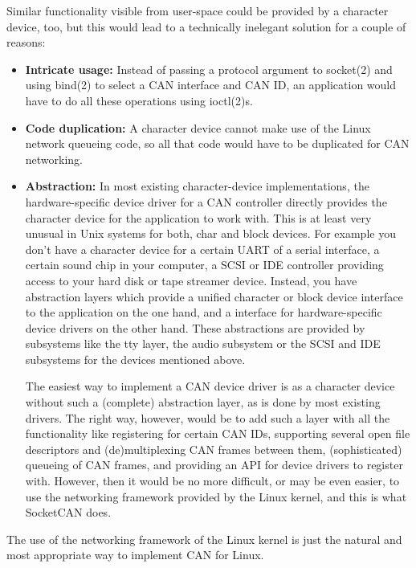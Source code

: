 \documentclass[a4paper,8pt,english]{sphinxmanual}
\begin{document}
Similar functionality visible from user-space could be provided by a
character device, too, but this would lead to a technically inelegant
solution for a couple of reasons:
\begin{itemize}
\item {} 
\textbf{Intricate usage:}  Instead of passing a protocol argument to
socket(2) and using bind(2) to select a CAN interface and CAN ID, an
application would have to do all these operations using ioctl(2)s.

\item {} 
\textbf{Code duplication:}  A character device cannot make use of the Linux
network queueing code, so all that code would have to be duplicated
for CAN networking.

\item {} 
\textbf{Abstraction:}  In most existing character-device implementations, the
hardware-specific device driver for a CAN controller directly
provides the character device for the application to work with.
This is at least very unusual in Unix systems for both, char and
block devices.  For example you don't have a character device for a
certain UART of a serial interface, a certain sound chip in your
computer, a SCSI or IDE controller providing access to your hard
disk or tape streamer device.  Instead, you have abstraction layers
which provide a unified character or block device interface to the
application on the one hand, and a interface for hardware-specific
device drivers on the other hand.  These abstractions are provided
by subsystems like the tty layer, the audio subsystem or the SCSI
and IDE subsystems for the devices mentioned above.

The easiest way to implement a CAN device driver is as a character
device without such a (complete) abstraction layer, as is done by most
existing drivers.  The right way, however, would be to add such a
layer with all the functionality like registering for certain CAN
IDs, supporting several open file descriptors and (de)multiplexing
CAN frames between them, (sophisticated) queueing of CAN frames, and
providing an API for device drivers to register with.  However, then
it would be no more difficult, or may be even easier, to use the
networking framework provided by the Linux kernel, and this is what
SocketCAN does.

\end{itemize}

The use of the networking framework of the Linux kernel is just the
natural and most appropriate way to implement CAN for Linux.
\end{document}
